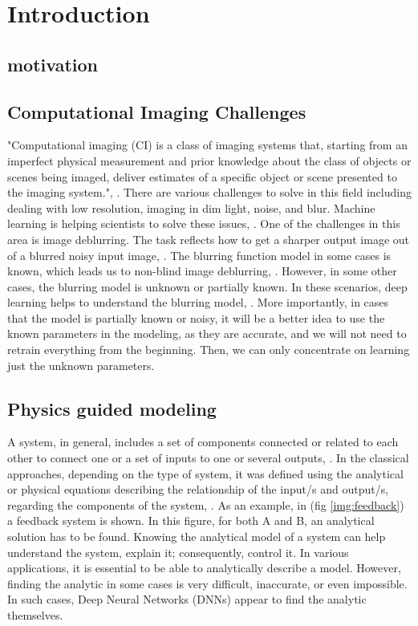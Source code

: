 \documentclass[conference, 11pt]{IEEEtran}
\begin{document}
	\pagebreak
	
	\section{Introduction}	
	\subsection{motivation}
	\subsection{Computational Imaging Challenges}
	"Computational imaging (CI) is a class of imaging systems that, starting from an imperfect physical measurement and prior knowledge about the class of objects or scenes being imaged, deliver estimates of a specific object or scene presented to the imaging system.", \cite{Ozcan2019}. There are various challenges to solve in this field including dealing with low resolution, imaging in dim light, noise, and blur. Machine learning is helping scientists to solve these issues, \cite{Ozcan2019}. One of the challenges in this area is image deblurring. The task reflects how to get a sharper output image out of a blurred noisy input image, \cite{Li2020}. The blurring function model in some cases is known, which leads us to non-blind image deblurring, \cite{Nan2020}. However, in some other cases, the blurring model is unknown or partially known. In these scenarios, deep learning helps to understand the blurring model, \cite{Li2020}. More importantly, in cases that the model is partially known or noisy, it will be a better idea to use the known parameters in the modeling, as they are accurate, and we will not need to retrain everything from the beginning. Then, we can only concentrate on learning just the unknown parameters.
	
	\subsection{Physics guided modeling}
	A system, in general, includes a set of components connected or related to each other to connect one or a set of inputs to one or several outputs, \cite{wiki:systems}. In the classical approaches, depending on the type of system, it was defined using the analytical or physical equations describing the relationship of the input/s and output/s, regarding the components of the system, \cite{wiki:systems}.  As an example, in (fig \ref{img:feedback}) a feedback system is shown. In this figure, for both A and B, an analytical solution has to be found. Knowing the analytical model of a system can help understand the system, explain it; consequently, control it. In various applications, it is essential to be able to analytically describe a model. However, finding the analytic in some cases is very difficult, inaccurate, or even impossible. In such cases, Deep Neural Networks (DNNs) appear to find the analytic themselves.
	
\end{document}
